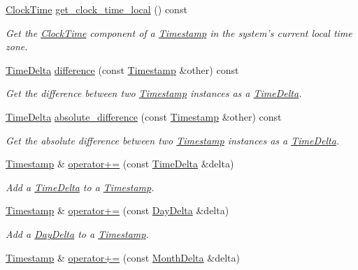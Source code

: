 \begin{DoxyCompactItemize}
\hyperlink{structClockTime}{Clock\-Time} \hyperlink{structTimestamp_a773a47fcdd02afef5d307bcc65561f8c}{get\-\_\-clock\-\_\-time\-\_\-local} () const 
\begin{DoxyCompactList}\small\item\em Get the \hyperlink{structClockTime}{Clock\-Time} component of a \hyperlink{structTimestamp}{Timestamp} in the system's current local time zone. \end{DoxyCompactList}\item 
\hyperlink{structTimeDelta}{Time\-Delta} \hyperlink{structTimestamp_af2520c21fa08751cfa7b195768e77171}{difference} (const \hyperlink{structTimestamp}{Timestamp} \&other) const 
\begin{DoxyCompactList}\small\item\em Get the difference between two \hyperlink{structTimestamp}{Timestamp} instances as a \hyperlink{structTimeDelta}{Time\-Delta}. \end{DoxyCompactList}\item 
\hyperlink{structTimeDelta}{Time\-Delta} \hyperlink{structTimestamp_a576febd2b61318c8f04a01eb75e78776}{absolute\-\_\-difference} (const \hyperlink{structTimestamp}{Timestamp} \&other) const 
\begin{DoxyCompactList}\small\item\em Get the absolute difference between two \hyperlink{structTimestamp}{Timestamp} instances as a \hyperlink{structTimeDelta}{Time\-Delta}. \end{DoxyCompactList}\item 
\hyperlink{structTimestamp}{Timestamp} \& \hyperlink{structTimestamp_a27c4a772939626101a580656769f705e}{operator+=} (const \hyperlink{structTimeDelta}{Time\-Delta} \&delta)
\begin{DoxyCompactList}\small\item\em Add a \hyperlink{structTimeDelta}{Time\-Delta} to a \hyperlink{structTimestamp}{Timestamp}. \end{DoxyCompactList}\item 
\hyperlink{structTimestamp}{Timestamp} \& \hyperlink{structTimestamp_a00a08e84b92522e73ec940402e776345}{operator+=} (const \hyperlink{structDayDelta}{Day\-Delta} \&delta)
\begin{DoxyCompactList}\small\item\em Add a \hyperlink{structDayDelta}{Day\-Delta} to a \hyperlink{structTimestamp}{Timestamp}. \end{DoxyCompactList}\item 
\hyperlink{structTimestamp}{Timestamp} \& \hyperlink{structTimestamp_a755999dea1918c7fbb3dbea5be60d9b5}{operator+=} (const \hyperlink{structMonthDelta}{Month\-Delta} \&delta)

\end{DoxyCompactItemize}
